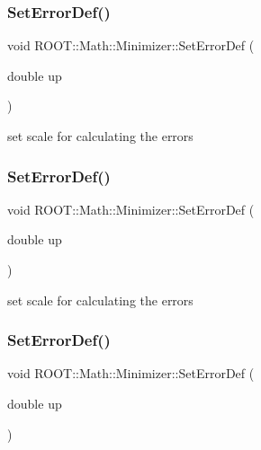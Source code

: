 \subsubsection{\texorpdfstring{SetErrorDef()}{SetErrorDef()}\hspace{0.1cm}{\footnotesize\ttfamily [1/3]}}
{\footnotesize\ttfamily void R\+O\+O\+T\+::\+Math\+::\+Minimizer\+::\+Set\+Error\+Def (\begin{DoxyParamCaption}\item[{double}]{up }\end{DoxyParamCaption})\hspace{0.3cm}{\ttfamily [inline]}}



set scale for calculating the errors 

\mbox{\label{classROOT_1_1Math_1_1Minimizer_a24e7d646b58b9d5d2778c7c0399677da}} 
\subsubsection{\texorpdfstring{SetErrorDef()}{SetErrorDef()}\hspace{0.1cm}{\footnotesize\ttfamily [2/3]}}
{\footnotesize\ttfamily void R\+O\+O\+T\+::\+Math\+::\+Minimizer\+::\+Set\+Error\+Def (\begin{DoxyParamCaption}\item[{double}]{up }\end{DoxyParamCaption})\hspace{0.3cm}{\ttfamily [inline]}}



set scale for calculating the errors 

\mbox{\label{classROOT_1_1Math_1_1Minimizer_a24e7d646b58b9d5d2778c7c0399677da}} 
\subsubsection{\texorpdfstring{SetErrorDef()}{SetErrorDef()}\hspace{0.1cm}{\footnotesize\ttfamily [3/3]}}
{\footnotesize\ttfamily void R\+O\+O\+T\+::\+Math\+::\+Minimizer\+::\+Set\+Error\+Def (\begin{DoxyParamCaption}\item[{double}]{up }\end{DoxyParamCaption})\hspace{0.3cm}{\ttfamily [inline]}}



